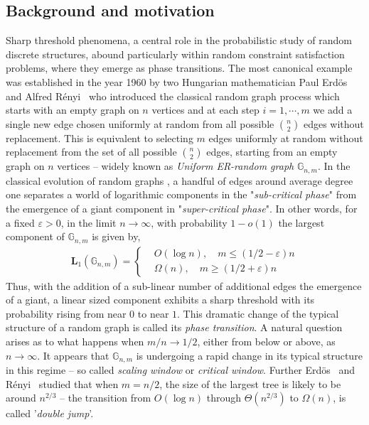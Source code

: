 \documentclass[11pt,reqno]{amsart}
\numberwithin{equation}{section}
\renewcommand{\vec}[1]{\boldsymbol{#1}}
\newcommand\vL{\vec L}
\newcommand\GG{\mathbb{G}}
\newcommand{\Erdos}{Erd\"os}
\newcommand{\Renyi}{R\'enyi}
\begin{document}
	\subsection{Background and motivation}\label{sec_background}
	Sharp threshold phenomena, a central role in the probabilistic study of random discrete structures, abound particularly within random constraint satisfaction problems, where they emerge as phase transitions.	
	The most canonical example was established in the year 1960 by two Hungarian mathematician Paul \Erdos~ and Alfred \Renyi~ \cite{ER} who introduced the classical random graph process which starts with an empty graph on $n$ vertices and at each step $i=1,\cdots,m$ we add a single new edge chosen uniformly at random from all possible $\binom{n}{2}$ edges without replacement. 
	This is equivalent to selecting $m$ edges uniformly at random without replacement from the set of all possible $\binom{n}{2}$ edges, starting from an empty graph on $n$ vertices -- widely known as \emph{Uniform ER-random graph} $\GG_{n,m}$.
	In the classical evolution of random graphs \cite{Bollobas}, a handful of edges around average degree one separates a world of logarithmic components in the "\emph{sub-critical phase}" from the emergence of a giant component in "\emph{super-critical phase}".
	In other words, for a fixed $\varepsilon>0$, in the limit $n\to \infty$, with probability $1-o(1)$ the largest component of $\GG_{n,m}$ is given by,
	\begin{align*}
		\vL_{1}(\GG_{n,m})=
		\begin{cases}
			&O(\log n), \quad m\leq \left(1/2 -\varepsilon\right)n \\
			&\Omega(n), \quad m\geq \left(1/2 +\varepsilon\right)n 
		\end{cases}
	\end{align*}
	Thus, with the addition of a sub-linear number of additional edges the emergence of a giant, a linear sized component exhibits a sharp threshold with its probability rising from near $0$ to near $1$.
	This dramatic change of the typical structure of a random graph is called its \emph{phase transition}.
	A natural question arises as to what happens when $m/n\to 1/2$, either from below or above, as $n\to\infty$.
	It appears that $\GG_{n,m}$ is undergoing a rapid change in its typical structure in this regime -- so called \emph{scaling window} or \emph{critical window}\cite{Bollobas}.
	Further \Erdos~ and \Renyi~ \cite{ER} studied that when $m=n/2$, the size of the largest tree is likely to be around $n^{2/3}$ -- the transition from $O(\log n)$ through $\Theta(n^{2/3})$ to $\Omega(n)$, is called '\emph{double jump}'.
	
\end{document}
